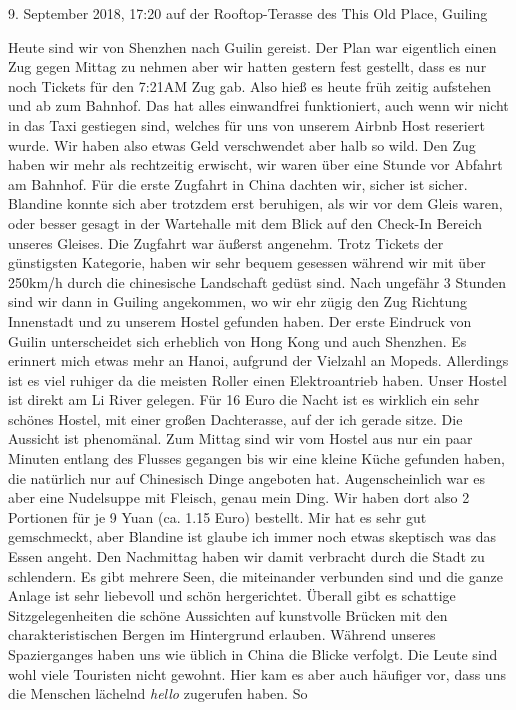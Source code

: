 \documentclass[11pt]{book}
\begin{document}
9. September 2018, 17:20 auf der Rooftop-Terasse des This Old Place, Guiling

Heute sind wir von Shenzhen nach Guilin gereist. Der Plan war eigentlich einen Zug gegen Mittag zu nehmen 
aber wir hatten gestern fest gestellt, dass es nur noch Tickets für den 7:21AM Zug gab. Also hieß es heute früh 
zeitig aufstehen und ab zum Bahnhof. Das hat alles einwandfrei funktioniert, auch wenn wir nicht in das Taxi 
gestiegen sind, welches für uns von unserem Airbnb Host reseriert wurde. Wir haben also etwas Geld verschwendet 
aber halb so wild. Den Zug haben wir mehr als rechtzeitig erwischt, wir waren über eine Stunde vor Abfahrt am 
Bahnhof. Für die erste Zugfahrt in China dachten wir, sicher ist sicher. Blandine konnte sich aber trotzdem erst 
beruhigen, als wir vor dem Gleis waren, oder besser gesagt in der Wartehalle mit dem Blick auf den Check-In 
Bereich unseres Gleises. Die Zugfahrt war äußerst angenehm. Trotz Tickets der günstigsten Kategorie, haben wir
sehr bequem gesessen während wir mit über 250km/h durch die chinesische Landschaft gedüst sind. Nach ungefähr 
3 Stunden sind wir dann in Guiling angekommen, wo wir ehr zügig den Zug Richtung Innenstadt und zu unserem 
Hostel gefunden haben. Der erste Eindruck von Guilin unterscheidet sich erheblich von Hong Kong und auch 
Shenzhen. Es erinnert mich etwas mehr an Hanoi, aufgrund der Vielzahl an Mopeds. Allerdings ist es viel ruhiger
da die meisten Roller einen Elektroantrieb haben. 
Unser Hostel ist direkt am Li River gelegen. Für 16 Euro die Nacht ist es wirklich ein sehr schönes Hostel, 
mit einer großen Dachterasse, auf der ich gerade sitze. Die Aussicht ist phenomänal. Zum Mittag sind wir vom 
Hostel aus nur ein paar Minuten entlang des Flusses gegangen bis wir eine kleine Küche gefunden haben, die 
natürlich nur auf Chinesisch Dinge angeboten hat. Augenscheinlich war es aber eine Nudelsuppe mit Fleisch, 
genau mein Ding. Wir haben dort also 2 Portionen für je 9 Yuan (ca. 1.15 Euro) bestellt. Mir hat es sehr gut 
gemschmeckt, aber Blandine ist glaube ich immer noch etwas skeptisch was das Essen angeht. Den Nachmittag haben wir 
damit verbracht durch die Stadt zu schlendern. Es gibt mehrere Seen, die miteinander verbunden sind und die 
ganze Anlage ist sehr liebevoll und schön hergerichtet. Überall gibt es schattige Sitzgelegenheiten die schöne 
Aussichten auf kunstvolle Brücken mit den charakteristischen Bergen im Hintergrund erlauben. Während unseres 
Spazierganges haben uns wie üblich in China die Blicke verfolgt. Die Leute sind wohl viele Touristen nicht 
gewohnt. Hier kam es aber auch häufiger vor, dass uns die Menschen lächelnd \emph{hello} zugerufen haben. So 
\end{document}

